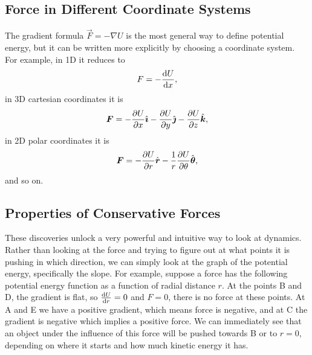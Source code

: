 \documentclass[../classical_mechanics.tex]{subfiles}
\begin{document}
        \subsection{Force in Different Coordinate Systems}\label{subsec:force-in-different-coordinate-systems}
            The gradient formula $\vec{F}=-\nabla U$ is the most general way to define potential energy, but it can be written more explicitly by choosing a coordinate system.
            For example, in 1D it reduces to
            \begin{equation}
                F=-\dv{U}{x},
            \end{equation}
            in 3D cartesian coordinates it is
            \begin{equation}
                \vec{F}=-\pdv{U}{x}\ihat-\pdv{U}{y}\jhat-\pdv{U}{z}\khat,
            \end{equation}
            in 2D polar coordinates it is
            \begin{equation}
                \vec{F}=-\pdv{U}{r}\uvec{r}-\frac{1}{r}\pdv{U}{\theta}\uvec{\theta},
            \end{equation}
            and so on.

        \subsection{Properties of Conservative Forces}\label{subsec:properties-of-conservative-forces}
            These discoveries unlock a very powerful and intuitive way to look at dynamics.
            Rather than looking at the force and trying to figure out at what points it is pushing in which direction, we can simply look at the graph of the potential energy, specifically the slope.
            For example, suppose a force has the following potential energy function as a function of radial distance $r$.
            At the points B and D, the gradient is flat, so $\dv{U}{r}=0$ and $F=0$, there is no force at these points.
            At A and E we have a positive gradient, which means force is negative, and at C the gradient is negative which implies a positive force.
            We can immediately see that an object under the influence of this force will be pushed towards B or to $r=0$, depending on where it starts and how much kinetic energy it has.
\end{document}
